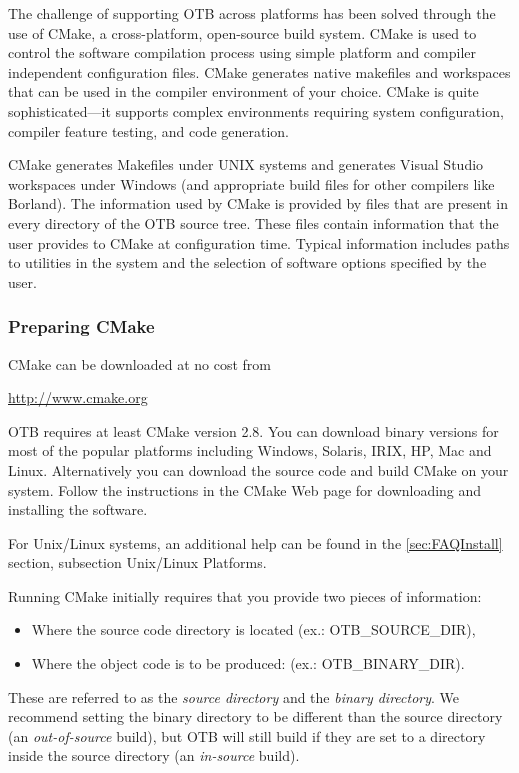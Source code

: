 The challenge of supporting OTB across platforms has been solved through the
use of CMake, a cross-platform, open-source build system. CMake is used to
control the software compilation process using simple platform and compiler
independent configuration files.  CMake generates native makefiles and
workspaces that can be used in the compiler environment of your choice. CMake
is quite sophisticated---it supports complex environments requiring system
configuration, compiler feature testing, and code generation.

CMake generates Makefiles under UNIX systems and generates Visual
Studio workspaces under Windows (and appropriate build files for other
compilers like Borland). The information used by CMake is provided by
 files that are present in every directory of the OTB
source tree. These files contain information that the user
provides to CMake at configuration time. Typical information includes paths
to utilities in the system and the selection of software options specified by
the user.

\subsubsection{Preparing CMake}
\label{sec:CMakeforOTB}


CMake can be downloaded at no cost from
\begin{center}
  \url{http://www.cmake.org}
\end{center}

OTB requires at least CMake version 2.8. You can download binary
versions for most of the popular platforms including Windows, Solaris,
IRIX, HP, Mac and Linux. Alternatively you can download the source
code and build CMake on your system. Follow the instructions in the
CMake Web page for downloading and installing the software.

For Unix/Linux systems, an additional help can be found in the \ref{sec:FAQInstall}
section, subsection Unix/Linux Platforms.

Running CMake initially requires that you provide two pieces of
information: 
\begin{itemize}
\item Where the source code directory is located (ex.: OTB\_SOURCE\_DIR),
\item Where the object code is to be produced: (ex.: OTB\_BINARY\_DIR). 
\end{itemize}
These are referred to as the \emph{source directory} and the \emph{binary directory}.
We recommend setting the binary directory to be different than the source directory (an
\emph{out-of-source} build), but OTB will still build if they are set
to a directory inside the source directory (an \emph{in-source} build). 

